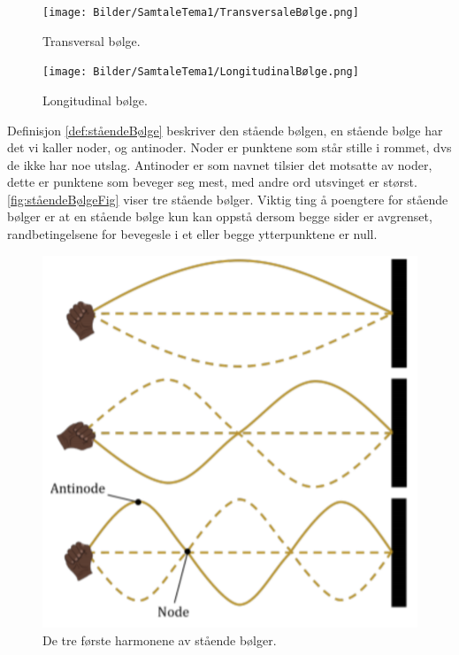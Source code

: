 \begin{figure}[!htb]
    \centering
    \texttt{[image: Bilder/SamtaleTema1/TransversaleBølge.png]}
    \caption{Transversal bølge. \cite{waves}}
    \label{fig:transversalBølge}
\end{figure}


\begin{figure}[!htb]
    \centering
    \texttt{[image: Bilder/SamtaleTema1/LongitudinalBølge.png]}
    \caption{Longitudinal bølge. \cite{waves}}
    \label{fig:longitudinalBølge}
\end{figure}

Definisjon \ref{def:ståendeBølge} beskriver den stående bølgen, en stående bølge har det vi kaller noder, og antinoder. Noder er punktene som står stille i rommet, dvs de ikke har noe utslag. Antinoder er som navnet tilsier det motsatte av noder, dette er punktene som beveger seg mest, med andre ord utsvinget er størst. \autoref{fig:ståendeBølgeFig} viser tre stående bølger. Viktig ting å poengtere for stående bølger er at en stående bølge kun kan oppstå dersom begge sider er avgrenset, randbetingelsene for bevegesle i et eller begge ytterpunktene er null.

\begin{figure}[!htb]
    \centering
    \includegraphics[scale=0.5]{Bilder/SamtaleTema1/sttåendeBølger.png}
    \caption{De tre første harmonene av stående bølger.}
    \label{fig:ståendeBølgeFig}
\end{figure}

